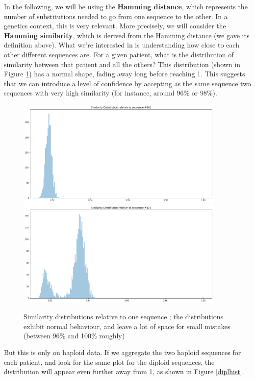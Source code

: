 \documentclass[usletter,11pt,final]{article}
\begin{document}
In the following, we will be using the \textbf{Hamming distance}, which represents the number of substitutions needed to go from one sequence to the other. In a genetics context, this is very relevant. More precisely, we will consider the \textbf{Hamming similarity}, which is derived from the Hamming distance (we gave its definition above). What we're interested in is understanding how close to each other different sequences are. For a given patient, what is the distribution of similarity between that patient and all the others? This distribution (shown in Figure \ref{indivhist}) has a normal shape, fading away long before reaching 1. This suggests that we can introduce a level of confidence by accepting as the same sequence two sequences with very high similarity (for instance, around 96\% or 98\%).

\begin{figure}
\begin{center}
\includegraphics[height=200px]{indivhist.png}
\includegraphics[height=200px]{indivhist121.png}
\caption{Similarity distributions relative to one sequence ; the distributions exhibit normal behaviour, and leave a lot of space for small mistakes (between 96\% and 100\% roughly)}
\label{indivhist}
\end{center}
\end{figure}

But this is only on haploid data. If we aggregate the two haploid sequences for each patient, and look for the same plot for the diploid sequences, the distribution will appear even further away from 1, as shown in Figure \ref{diplhist}.
\end{document}
